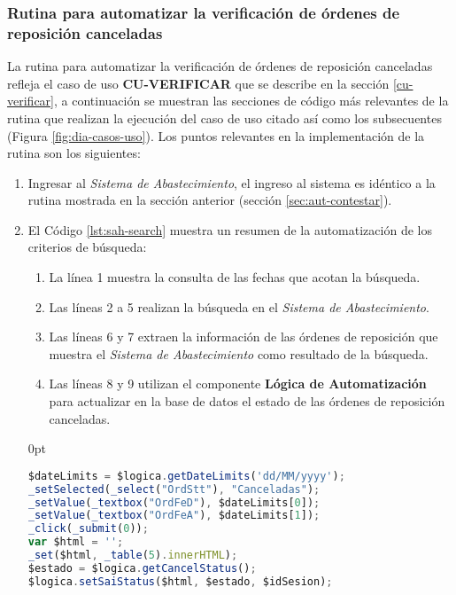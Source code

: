 \subsubsection{Rutina para automatizar la verificación de órdenes de reposición canceladas}
La rutina para automatizar la verificación de órdenes de reposición canceladas refleja el caso de uso \textbf{CU-VERIFICAR} que se describe en la sección \ref{cu-verificar}, a continuación se muestran las secciones de código más relevantes de la rutina que realizan la ejecución del caso de uso citado así como los subsecuentes (Figura \ref{fig:dia-casos-uso}). Los puntos relevantes en la implementación de la rutina son los siguientes:
\begin{enumerate}
	\item Ingresar al \textit{Sistema de Abastecimiento}, el ingreso al sistema es idéntico a la rutina mostrada en la sección anterior (sección \ref{sec:aut-contestar}).

	\item El Código \ref{lst:sah-search} muestra un resumen de la automatización de los criterios de búsqueda:
	\begin{enumerate}
		\item La línea 1 muestra la consulta de las fechas que acotan la búsqueda.
		\item Las líneas 2 a 5 realizan la búsqueda en el \textit{Sistema de Abastecimiento}.
		\item Las líneas 6 y 7 extraen la información de las órdenes de reposición que muestra el \textit{Sistema de Abastecimiento} como resultado de la búsqueda.
		\item Las líneas 8 y 9 utilizan el componente \textbf{Lógica de Automatización} para actualizar en la base de datos el estado de las órdenes de reposición canceladas.
	\end{enumerate}
	\begin{adjustwidth}{\listingfixwidth}{0pt}
	\begin{lstlisting}[language=Javascript, caption={Responder orden de reposición.}, captionpos=b, label={lst:sah-search}]
$dateLimits = $logica.getDateLimits('dd/MM/yyyy');
_setSelected(_select("OrdStt"), "Canceladas");
_setValue(_textbox("OrdFeD"), $dateLimits[0]);
_setValue(_textbox("OrdFeA"), $dateLimits[1]);
_click(_submit(0));
var $html = '';
_set($html, _table(5).innerHTML);
$estado = $logica.getCancelStatus();
$logica.setSaiStatus($html, $estado, $idSesion);
	\end{lstlisting}
	\end{adjustwidth}
\end{enumerate}
